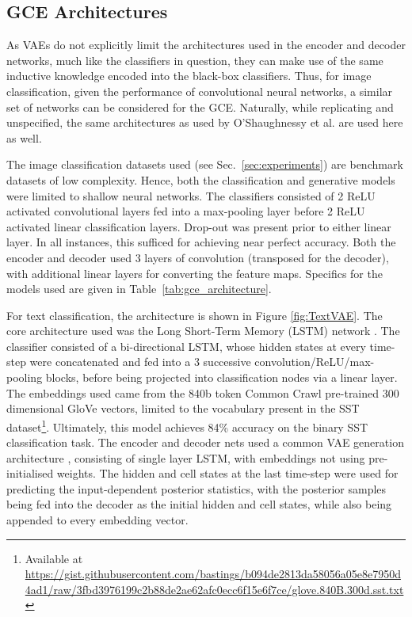 \subsection{GCE Architectures}\label{sec:gce}

As VAEs do not explicitly limit the architectures used in the encoder and decoder networks, much like the classifiers in question, they can make use of the same inductive knowledge encoded into the black-box classifiers. Thus, for image classification, given the performance of convolutional neural networks, a similar set of networks can be considered for the GCE. Naturally, while replicating and unspecified, the same architectures as used by O'Shaughnessy et al. are used here as well.

The image classification datasets used (see Sec.~\ref{sec:experiments}) are benchmark datasets of low complexity. Hence, both the classification and generative models were limited to shallow neural networks. The classifiers consisted of 2 ReLU activated convolutional layers fed into a max-pooling layer before 2 ReLU activated linear classification layers. Drop-out was present prior to either linear layer. In all instances, this sufficed for achieving near perfect accuracy. Both the encoder and decoder used 3 layers of convolution (transposed for the decoder), with additional linear layers for converting the feature maps. Specifics for the models used are given in Table~\ref{tab:gce_architecture}.

For text classification, the architecture is shown in Figure \ref{fig:TextVAE}. The core architecture used was the Long Short-Term Memory (LSTM) network \cite{hochreiter1997long}. The classifier consisted of a bi-directional LSTM, whose hidden states at every time-step were concatenated and fed into a 3 successive convolution/ReLU/max-pooling blocks, before being projected into classification nodes via a linear layer. The embeddings used came from the 840b token Common Crawl pre-trained 300 dimensional GloVe vectors, limited to the vocabulary present in the SST dataset\footnote{Available at \url{https://gist.githubusercontent.com/bastings/b094de2813da58056a05e8e7950d4ad1/raw/3fbd3976199c2b88de2ae62afc0ecc6f15e6f7ce/glove.840B.300d.sst.txt} }. Ultimately, this model achieves 84\% accuracy on the binary SST classification task. The encoder and decoder nets used a common VAE generation architecture \cite{kingma2014autoencoding}, consisting of single layer LSTM, with embeddings not using pre-initialised weights. The hidden and cell states at the last time-step were used for predicting the input-dependent posterior statistics, with the posterior samples being fed into the decoder as the initial hidden and cell states, while also being appended to every embedding vector. 

